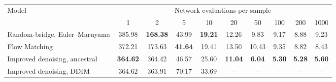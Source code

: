 \begin{tabular}{lccccccccc}
\toprule
Model & \multicolumn{9}{c}{Network evaluations per sample} \\
\cmidrule(lr){2-10}
 & 1 & 2 & 5 & 10 & 20 & 50 & 100 & 200 & 1000 \\
\midrule
Random-bridge, Euler--Maruyama & 385.98 & \textbf{168.38} & 43.99 & \textbf{19.21} & 12.26 & 9.83 & 9.17 & 8.88 & 9.23 \\
Flow Matching & 372.21 & 173.63 & \textbf{41.64} & 19.41 & 13.50 & 10.43 & 9.35 & 8.82 & 8.43 \\
Improved denoising, ancestral & \textbf{364.62} & 364.42 & 46.57 & 25.60 & \textbf{11.04} & \textbf{6.04} & \textbf{5.30} & \textbf{5.28} & \textbf{5.60} \\
Improved denoising, DDIM & 364.62 & 363.91 & 70.17 & 33.69 & -- & -- & -- & -- & -- \\
\bottomrule
\end{tabular}
